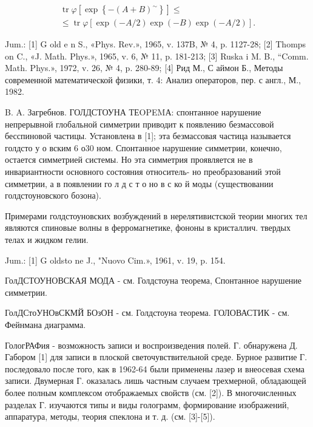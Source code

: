 \documentclass[10pt]{article}
\begin{document}
\[

\begin{gathered}

\operatorname{tr} \varphi\left[\exp \left\{-(A+B)^{\sim}\right\}\right] \leqslant \\

\leqslant \operatorname{tr} \varphi[\exp (-A / 2) \exp (-B) \exp (-A / 2)] .

\end{gathered}

\]



Jum.: [1] G old e n S., «Phys. Rev.», 1965, v. 137B, № 4, p. 1127-28; [2] Thomps on C., «J. Math. Phys.», 1965, v. 6, № 11, p. 181-213; [3] Ruska i M. B., “Comm. Math. Phys.», 1972, v. 26, № 4, p. 280-89; [4] Рид М., С аймон Б., Методы современной математической физики, т. 4: Анализ операторов, пер. с англ., М., 1982.



B. A. Загребнов. ГОЛДСТОУНА ТЕOPEMА: спонтанное нарушение непрерывной глобальной симметрии приводит к появлению безмассовой бесспиновой частицы. Установлена в [1]; эта безмассовая частица называется голдсто у о вским 6 о30 ном. Спонтанное нарушение симметрии, конечно, остается симметрией системы. Но эта симметрия проявляется не в инвариантности основного состояния относитель- но преобразований этой симметрии, а в появлении го л д с т о но в с ко й моды (существовании голдстоуновского бозона).



Примерами голдстоуновских возбуждений в нерелятивистской теории многих тел являются спиновые волны в ферромагнетике, фононы в кристаллич. твердых телах и жидком гелии.



Jum.: [1] G oldsto ne J., "Nuovo Cim.», 1961, v. 19, p. 154.



ГолДСТОУНОВСКАЯ МОДА - см. Голдстоуна теорема, Спонтанное нарушение симметрии.



ГолДСтоУНОвСКМЙ БОзОН - см. Голдстоуна теорема. ГОЛОВАСТИК - см. Фейнмана диаграмма.



ГологРАФия - возможность записи и воспроизведения полей. Г. обнаружена Д. Габором [1] для записи в плоской светочувствительной среде. Бурное развитие Г. последовало после того, как в 1962-64 были применены лазер и внеосевая схема записи. Двумерная Г. оказалась лишь частным случаем трехмерной, обладающей более полным комплексом отображаемых свойств (см. [2]). В многочисленных разделах Г. изучаются типы и виды голограмм, формирование изображений, аппаратура, методы, теория спеклона и т. д. (см. [3]-[5]).
\end{document}
